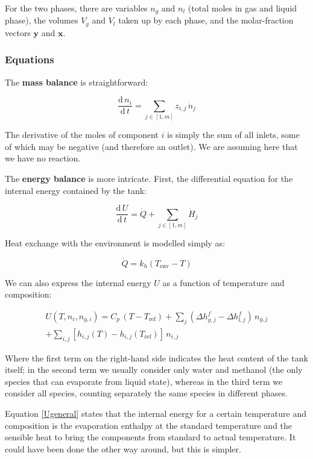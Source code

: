 \documentclass[a4paper]{article}
\renewcommand{\d}{\ensuremath{\mathrm{d}}}
\newcommand{\der}[2]{\ensuremath{\frac{\d \, #1}{\d \, #2}}}
\begin{document}
For the two phases, there are variables $n_g$ and $n_l$ (total moles in gas and
liquid phase), the volumes $V_g$ and $V_l$ taken up by each phase, and the
molar-fraction vectors $\mathbf{y}$ and $\mathbf{x}$.

\subsubsection{Equations}
The \textbf{mass balance} is straightforward:

\begin{equation}
\der{n_i}{t} = \sum_{j \in [1, m]} z_{i,j}\,\dot n_j
\end{equation}

The derivative of the moles of component $i$ is simply the sum of all inlets,
some of which may be negative (and therefore an outlet). We are assuming here
that we have no reaction.

The \textbf{energy balance} is more intricate. First, the differential equation for the
internal energy contained by the tank:

\begin{equation}
\label{firstlaw}
\der{U}{t} = \dot Q + \sum_{j \in [1, m]} \dot H_j
\end{equation}

Heat exchange with the environment is modelled simply as:

\begin{equation}
\dot Q = k_h ( T_\text{env} - T )
\end{equation}

We can also express the internal energy $U$ as a function of temperature and
composition:

\begin{multline}
\label{Ugeneral}
U(T, n_i, n_{g,i}) = C_p \, ( T - T_\text{ref} ) +
\sum_j \left (\Delta h _{g,j}^f - \Delta h _{l,j}^f \right) \, n_{g,j} \\
+ \sum_{i,j} [ h_{i,j}(T) - h_{i,j}(T_\text{ref})] \, n_{i,j}
\end{multline}


Where the first term on the right-hand side indicates the heat content of the
tank itself; in the second term we usually consider only water
and methanol (the only species that can evaporate from liquid state), whereas
in the third term we consider all species, counting separately the same species
in different phases.

Equation \ref{Ugeneral} states that the internal energy for a certain
temperature and composition is the evaporation enthalpy at the standard
temperature and the sensible heat to bring the components from standard to
actual temperature. It could have been done the other way around, but this is
simpler.
\end{document}
